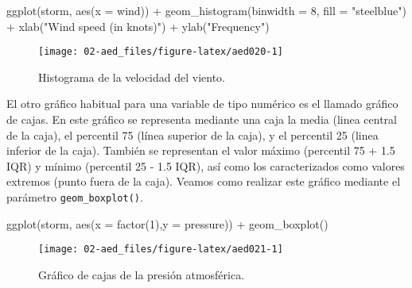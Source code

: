 \documentclass[
]{book}
\newenvironment{Shaded}{\begin{snugshade}}{\end{snugshade}}
\newcommand{\AttributeTok}[1]{\textcolor[rgb]{0.77,0.63,0.00}{#1}}
\newcommand{\DecValTok}[1]{\textcolor[rgb]{0.00,0.00,0.81}{#1}}
\newcommand{\FunctionTok}[1]{\textcolor[rgb]{0.00,0.00,0.00}{#1}}
\newcommand{\NormalTok}[1]{#1}
\newcommand{\SpecialCharTok}[1]{\textcolor[rgb]{0.00,0.00,0.00}{#1}}
\newcommand{\StringTok}[1]{\textcolor[rgb]{0.31,0.60,0.02}{#1}}
\begin{document}
\begin{Shaded}
\begin{Highlighting}[]
\FunctionTok{ggplot}\NormalTok{(storm, }\FunctionTok{aes}\NormalTok{(}\AttributeTok{x =}\NormalTok{ wind)) }\SpecialCharTok{+} 
  \FunctionTok{geom\_histogram}\NormalTok{(}\AttributeTok{binwidth =} \DecValTok{8}\NormalTok{, }\AttributeTok{fill =} \StringTok{"steelblue"}\NormalTok{) }\SpecialCharTok{+} 
  \FunctionTok{xlab}\NormalTok{(}\StringTok{"Wind speed (in knots)"}\NormalTok{) }\SpecialCharTok{+} \FunctionTok{ylab}\NormalTok{(}\StringTok{"Frequency"}\NormalTok{)}
\end{Highlighting}
\end{Shaded}

\begin{figure}

{\centering \texttt{[image: 02-aed\_files/figure-latex/aed020-1]} 

}

\caption{Histograma de la velocidad del viento.}\label{fig:aed020}
\end{figure}

El otro gráfico habitual para una variable de tipo numérico es el llamado gráfico de cajas. En este gráfico se representa mediante una caja la media (linea central de la caja), el percentil 75 (línea superior de la caja), y el percentil 25 (linea inferior de la caja). También se representan el valor máximo (percentil 75 + 1.5 IQR) y mínimo (percentil 25 - 1.5 IQR), así como los caracterizados como valores extremos (punto fuera de la caja). Veamos como realizar este gráfico mediante el parámetro \texttt{geom\_boxplot()}.

\begin{Shaded}
\begin{Highlighting}[]
\FunctionTok{ggplot}\NormalTok{(storm, }\FunctionTok{aes}\NormalTok{(}\AttributeTok{x =} \FunctionTok{factor}\NormalTok{(}\DecValTok{1}\NormalTok{),}\AttributeTok{y =}\NormalTok{ pressure)) }\SpecialCharTok{+}
   \FunctionTok{geom\_boxplot}\NormalTok{()}
\end{Highlighting}
\end{Shaded}

\begin{figure}

{\centering \texttt{[image: 02-aed\_files/figure-latex/aed021-1]} 

}

\caption{Gráfico de cajas de la presión atmosférica.}\label{fig:aed021}
\end{figure}
\end{document}
